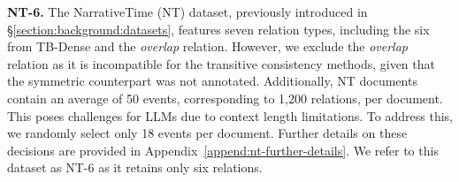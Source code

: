 \textbf{NT-6.} The NarrativeTime (NT) dataset, previously introduced in §\ref{section:background:datasets}, features seven relation types, including the six from TB-Dense and the \textit{overlap} relation. 
However, we exclude the \textit{overlap} relation as it is incompatible for the transitive consistency methods, given that the symmetric counterpart was not annotated.
Additionally, NT documents contain an average of 50 events, corresponding to 1,200 relations, per document. This poses challenges for LLMs due to context length limitations. To address this, we randomly select only 18 events per document.  
Further details on these decisions are provided in Appendix~\ref{append:nt-further-details}. We refer to this dataset as NT-6 as it retains only six relations.




